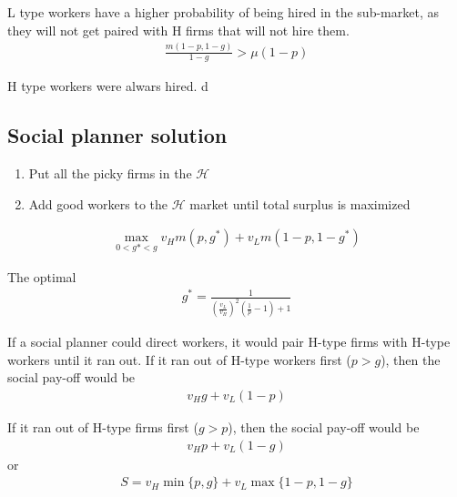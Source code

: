 \documentclass[12pt]{article}
\newcommand{\Hsm}{$\mathcal{H}$}
\begin{document}
L type workers have a higher probability of being hired in the sub-market, as they will not get paired with H firms that will not hire them.
\begin{align}
  \frac{m(1 - p, 1 - g)}{1 - g} > \mu (1 - p)
\end{align}

H type workers were alwars hired.
d


\subsection{Social planner solution}

\begin{enumerate}
\item Put all the picky firms in the \Hsm{}
\item Add good workers to the \Hsm{} market until total surplus is maximized 
\end{enumerate} 

\begin{align}
  \max_{0 < g* < g} v_H m(p, g^*) + v_L m(1 - p, 1 -  g^*) 
\end{align}

The optimal
\begin{align}
  g^* = \frac{1}{\left(\frac{v_L}{v_H}\right)^2 \left(\frac{1}{p} - 1\right) + 1}
\end{align}

If a social planner could direct workers, it would pair H-type firms with H-type workers until it ran out.
If it ran out of H-type workers first ($p > g$), then the social pay-off would be
\begin{align}
  v_H g + v_L (1 - p)
\end{align}

If it ran out of H-type firms first ($g > p$), then the social pay-off would be
\begin{align}
  v_H p + v_L (1 - g)
\end{align}
or
\begin{align}
 S = v_H \min\{p, g\} + v_L \max\{1-p,1-g\}
\end{align}
\end{document}
